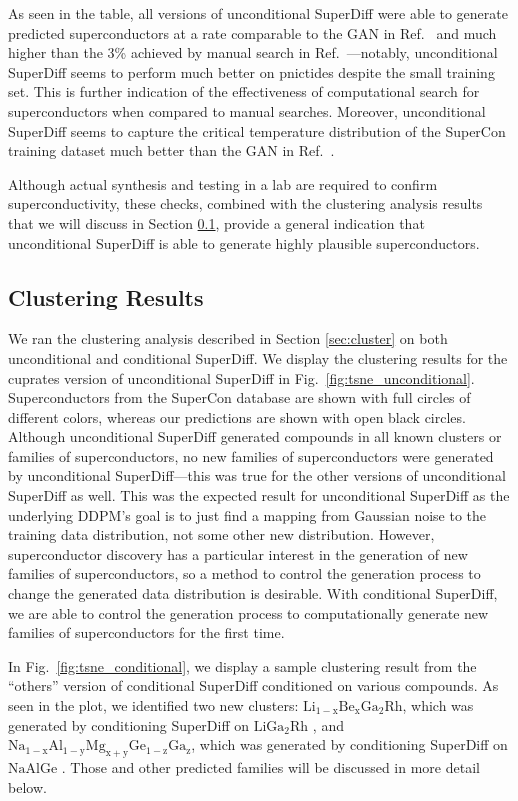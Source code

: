 \documentclass[%
reprint,
 amsmath,amssymb,
 aps,
prb,
]{revtex4-2}
\begin{document}
As seen in the table, all versions of unconditional SuperDiff were able to generate predicted superconductors at a rate comparable to the GAN in Ref.~\cite{Kim_2024} and much higher than the 3\% achieved by manual search in Ref.~\cite{Hosono2015}---notably, unconditional SuperDiff seems to perform much better on pnictides despite the small training set. This is further indication of the effectiveness of computational search for superconductors when compared to manual searches. Moreover, unconditional SuperDiff seems to capture the critical temperature distribution of the SuperCon training dataset much better than the GAN in Ref.~\cite{Kim_2024}.

Although actual synthesis and testing in a lab are required to confirm superconductivity, these checks, combined with the clustering analysis results that we will discuss in Section \ref{sec:clusteringresults}, provide a general indication that unconditional SuperDiff is able to generate highly plausible superconductors.


\subsection{Clustering Results}
\label{sec:clusteringresults}

We ran the clustering analysis described in Section \ref{sec:cluster} on both unconditional and conditional SuperDiff. We display the clustering results for the cuprates version of unconditional SuperDiff in Fig.~\ref{fig:tsne_unconditional}. Superconductors from the SuperCon database are shown with full circles of different colors, whereas our predictions are shown with open black circles. Although unconditional SuperDiff generated compounds in all known clusters or families of superconductors, no new families of superconductors were generated by unconditional SuperDiff---this was true for the other versions of unconditional SuperDiff as well. This was the expected result for unconditional SuperDiff as the underlying DDPM's goal is to just find a mapping from Gaussian noise to the training data distribution, not some other new distribution. However, superconductor discovery has a particular interest in the generation of new families of superconductors, so a method to control the generation process to change the generated data distribution is desirable. With conditional SuperDiff, we are able to control the generation process to computationally generate new families of superconductors for the first time.

In Fig.~\ref{fig:tsne_conditional}, we display a sample clustering result from the ``others'' version of conditional SuperDiff conditioned on various compounds. As seen in the plot, we identified two new clusters: $\mathrm{Li_{1-x}Be_{x}Ga_{2}Rh}$, which was generated by conditioning SuperDiff on $\mathrm{LiGa_2Rh}$ \cite{MONDAL20221354142}, and $\mathrm{Na_{1-x}Al_{1-y}Mg_{x+y}Ge_{1-z}Ga_{z}}$, which was generated by conditioning SuperDiff on $\mathrm{NaAlGe}$ \cite{PhysRevMaterials.7.104801}. Those and other predicted families will be discussed in more detail below.
\end{document}
